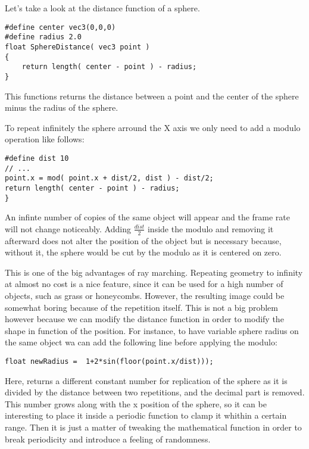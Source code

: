 Let's take a look at the distance function of a sphere.

\begin{lstlisting}
#define center vec3(0,0,0)
#define radius 2.0
float SphereDistance( vec3 point )
{
    return length( center - point ) - radius;
}
\end{lstlisting}

This functions returns the distance between a point and the center of the sphere
minus the radius of the sphere.

To repeat infinitely the sphere arround the X axis we only need to add a modulo
operation like follows:

\begin{lstlisting}
#define dist 10
// ...
point.x = mod( point.x + dist/2, dist ) - dist/2;
return length( center - point ) - radius;
}
\end{lstlisting}

An infinte number of copies of the same object will appear and the frame rate will not change
noticeably. Adding $\frac{dist}{2}$ inside the modulo and removing it afterward does not alter
the position of the object but is necessary because, without it, the sphere would
be cut by the modulo as it is centered on zero.



This is one of the big advantages of ray marching. Repeating geometry to infinity
at almost no cost is a nice feature, since it can be used for a high number of objects,
such as grass or honeycombs. However, the resulting image could be somewhat boring because
of the repetition itself. This is not a big problem however because we can modify
the distance function in order to modify the shape in function of the position.
For instance, to have variable sphere radius on the same object wa can add the following
line before applying the modulo:

\begin{lstlisting}
float newRadius =  1+2*sin(floor(point.x/dist)));
\end{lstlisting}

Here,  returns a different constant number for replication
of the sphere as it is divided by the distance between two repetitions, and the decimal part
is removed. This number grows along with the x position of the sphere, so it
can be interesting to place it inside a periodic function to clamp it
whithin a certain range. Then it is just a matter of tweaking the mathematical
function in order to break periodicity and introduce a feeling of randomness.

